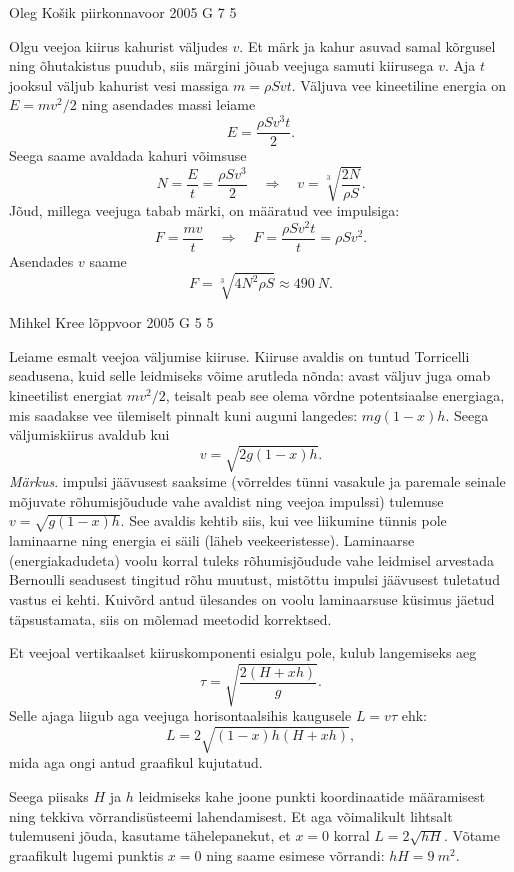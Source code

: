 \documentclass[11pt]{article}
\begin{document}
{%
{Oleg Košik} %
{piirkonnavoor} %
{2005} %
{G 7} %
{5} %
{

\ifSolution
Olgu veejoa kiirus kahurist väljudes $v$. Et märk ja kahur asuvad samal kõrgusel ning õhutakistus puudub, siis märgini jõuab veejuga samuti kiirusega $v$. Aja $t$ jooksul väljub kahurist vesi massiga $m = \rho Svt$. Väljuva vee kineetiline energia on $E = mv^2/2$ ning asendades massi leiame
\[
E = \frac{\rho Sv^3t}{2}.
\]
Seega saame avaldada kahuri võimsuse
\[
N=\frac{E}{t}=\frac{\rho S v^{3}}{2} \quad \Rightarrow \quad v=\sqrt[3]{\frac{2 N}{\rho S}}.
\]
Jõud, millega veejuga tabab märki, on määratud vee impulsiga:
\[
F=\frac{m v}{t} \quad \Rightarrow \quad F=\frac{\rho S v^{2} t}{t}=\rho S v^{2}.
\]
Asendades $v$ saame
\[
F=\sqrt[3]{4 N^{2} \rho S} \approx \SI{490}{N}.
\]
\fi
}

{Mihkel Kree} %
{lõppvoor} %
{2005} %
{G 5} %
{5} %
{

\ifSolution
Leiame esmalt veejoa väljumise kiiruse. Kiiruse avaldis on tuntud Torricelli seadusena, kuid selle leidmiseks võime arutleda nõnda: avast väljuv juga omab kineetilist energiat $mv^2/2$, teisalt peab see olema võrdne potentsiaalse energiaga, mis saadakse vee ülemiselt pinnalt kuni auguni langedes: $mg(1 - x)h$. Seega väljumiskiirus avaldub kui
\[
v = \sqrt{2g(1 - x)h}.
\]
\emph{Märkus}. impulsi jäävusest saaksime (võrreldes tünni vasakule ja paremale seinale mõjuvate rõhumisjõudude vahe avaldist ning veejoa impulssi) tulemuse $v = \sqrt{g(1 - x)h}$. See avaldis kehtib siis, kui vee liikumine tünnis pole laminaarne ning energia ei säili (läheb veekeeristesse). Laminaarse (energiakadudeta) voolu korral tuleks rõhumisjõudude vahe leidmisel arvestada Bernoulli seadusest tingitud rõhu muutust, mistõttu impulsi jäävusest tuletatud vastus ei kehti. Kuivõrd antud ülesandes on voolu laminaarsuse küsimus jäetud täpsustamata, siis on mõlemad meetodid korrektsed.

Et veejoal vertikaalset kiiruskomponenti esialgu pole, kulub langemiseks aeg
\[
\tau = \sqrt{\frac{2(H+xh)}{g}}.
\]
Selle ajaga liigub aga veejuga horisontaalsihis kaugusele $L = v\tau$ ehk:
\[
L=2 \sqrt{(1-x) h(H+x h)},
\]
mida aga ongi antud graafikul kujutatud.

Seega piisaks $H$ ja $h$ leidmiseks kahe joone punkti koordinaatide määramisest ning tekkiva võrrandisüsteemi lahendamisest. Et aga võimalikult lihtsalt tulemuseni jõuda, kasutame tähelepanekut, et $x = 0$ korral $L = 2\sqrt{hH}$. Võtame graafikult lugemi punktis $x = 0$ ning saame esimese võrrandi: $hH = \SI{9}{m^2}$.

}}
\end{document}
